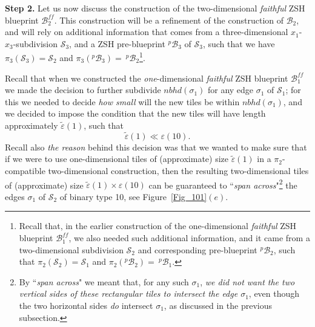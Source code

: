 \documentclass[12pt,letterpaper]{article}
\renewcommand{\S}{\mathcal{S}}
\newcommand{\B}{\mathcal{B}}
\newcommand{\eps}{\varepsilon}
\newcommand{\et}{\tilde\eps}
\newcommand{\nbhd}{\mathit{nbhd}}
\begin{document}





\bigskip 

\noindent
{\bf Step 2.} Let us now discuss the construction of the two-dimensional {\em faithful} ZSH blueprint $\B_2^\mathit{ff}$. This construction will be a refinement of the construction of $\B_2$, and will rely on additional information that comes from a three-dimensional $x_1$-$x_3$-subdivision $\S_3$, and a ZSH pre-blueprint $^p\!\B_3$ of $\S_3$, such that we have $\pi_3(\S_3) = \S_2$ and $\pi_3(^p\!\B_3) = \ ^p\!\B_2$\footnote{Recall that, in the earlier construction of  the one-dimensional {\em faithful} ZSH blueprint $\B_1^\mathit{ff}$, we also needed such additional information, and it came from a two-dimensional subdivision $\S_2$ and corresponding pre-blueprint $^p\!\B_2$, such that $\pi_2(\S_2) = \S_1$ and $\pi_2(^p\!\B_2) = \ ^p\!\B_1$.}. 

Recall that when we constructed the {\em one}-dimensional {\em faithful} ZSH blueprint $\B_1^\mathit{ff}$ we made the decision to further subdivide $\nbhd(\sigma_1)$ for any edge $\sigma_1$ of $\S_1$; for this we needed to decide {\em how small} will the new tiles be within $\nbhd(\sigma_1)$, and we decided to impose the condition that the new tiles will have length approximately $\et(1)$, such that 
$$
\et(1) \ll \eps(10).
$$
Recall also  {\em the reason} behind this decision was that we wanted to make sure that if we were to use one-dimensional tiles of (approximate) size $\et(1)$ in a $\pi_2$-compatible two-dimensional construction, then the resulting two-dimensional tiles of (approximate) size $\et(1) \times \eps(10)$ can be guaranteed to ``{\em span across}"\footnote{By ``{\em span across}" we meant that, for any such $\sigma_1$, {\em we did not  want  the two vertical sides of these rectangular tiles to intersect the edge $\sigma_1$}, even though the two horizontal sides {\em do} intersect $\sigma_1$, as discussed in the previous subsection.} the edges $\sigma_1$ of $\S_2$ of binary type 10, see Figure~\ref{Fig_101}$(e)$.
\end{document}
